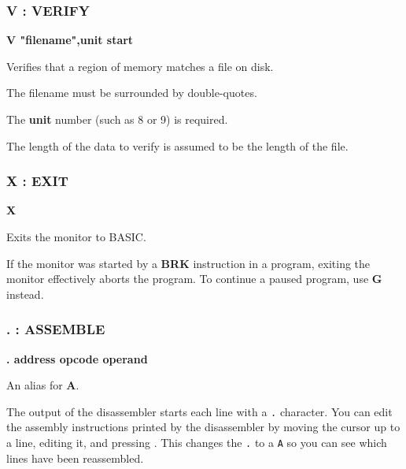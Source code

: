 \subsubsection{V : VERIFY}
\begin{description}[leftmargin=2cm,style=nextline]
\item [Format:] {\bf V "filename",unit start}
\item [Usage:] Verifies that a region of memory matches a file on disk.

\item [Remarks:] The filename must be surrounded by double-quotes.

    The {\bf unit} number (such as 8 or 9) is required.

    The length of the data to verify is assumed to be the length of the file.


\end{description}


\subsubsection{X : EXIT}
\begin{description}[leftmargin=2cm,style=nextline]
\item [Format:] {\bf X}
\item [Usage:] Exits the monitor to BASIC.

\item [Remarks:] If the monitor was started by a {\bf BRK} instruction in a program, exiting the monitor effectively aborts the program. To continue a paused program, use {\bf G} instead.

\end{description}


\subsubsection{. : ASSEMBLE}
\begin{description}[leftmargin=2cm,style=nextline]
\item [Format:] {\bf . address opcode operand}
\item [Usage:] An alias for {\bf A}.

\item [Remarks:] The output of the disassembler starts each line with a {\tt .} character. You can edit the assembly instructions printed by the disassembler by moving the cursor up to a line, editing it, and pressing . This changes the {\tt .} to a {\tt A} so you can see which lines have been reassembled.

\end{description}

